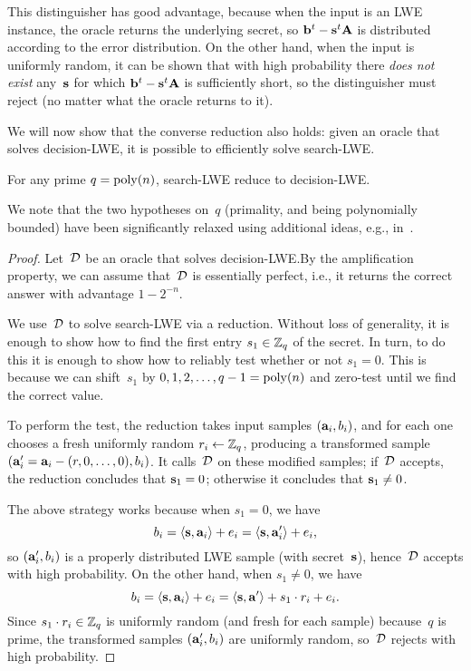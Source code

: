\documentclass[11pt]{article}
\begin{document}
This distinguisher has good advantage, because when the input is an
LWE instance, the oracle returns the underlying secret, so
$\mathbf{b}^{t} - \mathbf{s}^{t} \mathbf{A}$ is distributed according to the error
distribution. On the other hand, when the input is uniformly random,
it can be shown that with high probability there \emph{does not exist}
any~$\mathbf{s}$ for which $\mathbf{b}^{t} - \mathbf{s}^{t} \mathbf{A}$ is sufficiently
short, so the distinguisher must reject (no matter what the oracle
returns to it).

We will now show that the converse reduction also holds: given an
oracle that solves decision-LWE, it is possible to efficiently solve
search-LWE.

\begin{theorem}
  For any prime $q = \operatorname{poly}(n)$, search-LWE reduce to decision-LWE.
\end{theorem}

We note that the two hypotheses on~$q$ (primality, and being
polynomially bounded) have been significantly relaxed using additional
ideas, e.g., in~\cite{DBLP:conf/stoc/Peikert09}.

\begin{proof}
  Let~$\mathcal{D}$ be an oracle that solves decision-LWE.\@ By the
  amplification property, we can assume that~$\mathcal{D}$ is essentially
  perfect, i.e., it returns the correct answer with advantage
  $1 - 2^{-n}$.

  We use~$\mathcal{D}$ to solve search-LWE via a reduction. Without loss of
  generality, it is enough to show how to find the first entry
  $s_1 \in \mathbb{Z}_q$ of the secret. In turn, to do this it is enough to
  show how to reliably test whether or not $s_1 = 0$. This is because
  we can shift~$s_1$ by $0,1,2,\ldots,q-1 = \operatorname{poly}(n)$ and zero-test
  until we find the correct value.

  To perform the test, the reduction takes input samples
  $(\mathbf{a}_{i},b_{i})$, and for each one chooses a fresh uniformly
  random $r_{i} \gets \mathbb{Z}_q$, producing a transformed sample
  $(\mathbf{a}'_{i} = \mathbf{a}_{i} - (r,0,\ldots,0), b_{i})$. It calls~$\mathcal{D}$
  on these modified samples; if~$\mathcal{D}$ accepts, the reduction
  concludes that $\mathbf{s}_1 = 0$; otherwise it concludes that
  $\mathbf{s}_1 \neq 0$.

  The above strategy works because when $s_1 = 0$, we have
  \[ b_{i} = \langle\mathbf{s},\mathbf{a}_{i}\rangle+e_{i} =
    \langle\mathbf{s},\mathbf{a}'_{i}\rangle+e_{i} , \] so $(\mathbf{a}'_{i}, b_{i})$ is a
  properly distributed LWE sample (with secret~$\mathbf{s}$), hence~$\mathcal{D}$
  accepts with high probability. On the other hand, when $s_1 \neq 0$,
  we have
  \[ b_{i} = \langle\mathbf{s},\mathbf{a}_{i}\rangle+e_{i} = \langle\mathbf{s},\mathbf{a}'\rangle +
    s_1 \cdot r_{i} + e_{i} . \] Since $s_1 \cdot r_{i} \in \mathbb{Z}_q$ is
  uniformly random (and fresh for each sample) because~$q$ is prime,
  the transformed samples $(\mathbf{a}'_{i},b_{i})$ are uniformly random,
  so~$\mathcal{D}$ rejects with high probability.
\end{proof}
\end{document}
